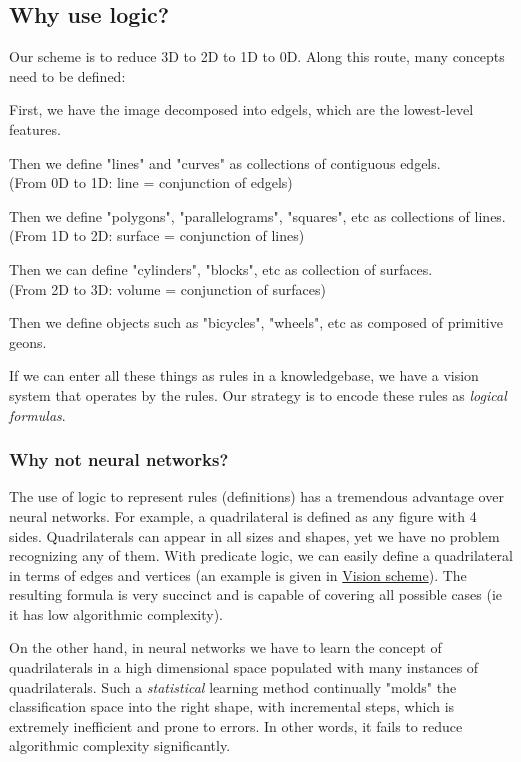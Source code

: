 \subsection{Why use logic?}

 Our scheme is to reduce 3D to 2D to 1D to 0D. Along this route, many concepts need to be defined:
\begin{compactenum}
	\item  First, we have the image decomposed into edgels, which are the lowest-level features.
	\item  Then we define "lines" and "curves" as collections of contiguous edgels.
\\
    (From 0D to 1D: line = conjunction of edgels)
	\item  Then we define "polygons", "parallelograms", "squares", etc as collections of lines.
\\
    (From 1D to 2D: surface = conjunction of lines) 
	\item  Then we can define "cylinders", "blocks", etc as collection of surfaces.
\\
    (From 2D to 3D: volume = conjunction of surfaces)
	\item Then we define objects such as "bicycles", "wheels", etc as composed of primitive geons.
\end{compactenum}

If we can enter all these things as rules in a knowledgebase, we have a vision system that operates by the rules. Our strategy is to encode these rules as \emph{logical formulas}.

\subsubsection{Why not neural networks? }

The use of logic to represent rules (definitions) has a tremendous advantage over neural networks. For example, a quadrilateral is defined as any figure with 4 sides. Quadrilaterals can appear in all sizes and shapes, yet we have no problem recognizing any of them. With predicate logic, we can easily define a quadrilateral in terms of edges and vertices (an example is given in \href{Vis-BasicScheme.htm}{Vision scheme}). The resulting formula is very succinct and is capable of covering all possible cases (ie it has low algorithmic complexity).

On the other hand, in neural networks we have to learn the concept of quadrilaterals in a high dimensional space populated with many instances of quadrilaterals. Such a \emph{statistical} learning method continually "molds" the classification space into the right shape, with incremental steps, which is extremely inefficient and prone to errors. In other words, it fails to reduce algorithmic complexity significantly.

